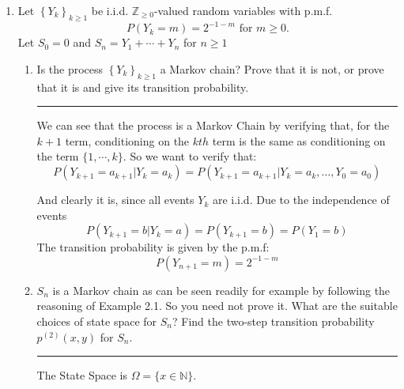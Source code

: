 \documentclass{article} %
\theoremstyle{plain}
\theoremstyle{case}
\begin{document}
\begin{enumerate}[label={\fbox{\textbf{Exercise \#\arabic* :}}}]
  \newpage
  \item Let $\left\{Y_k\right\}_{k \geq 1}$ be i.i.d. $\mathbb{Z}_{\geq 0}$-valued random variables with p.m.f.
    \[
      P\left(Y_k=m\right)=2^{-1-m} \text { for } m \geq 0 .
      \]
    Let $S_0=0$ and $S_n=Y_1+\cdots+Y_n$ for $n \geq 1$
    \begin{enumerate}
      \item Is the process $\left\{Y_k\right\}_{k \geq 1}$ a Markov chain?
        Prove that it is not, or prove that it is and give its transition
        probability.
\par\noindent\rule{\textwidth}{0.1pt}
        We can see that the process is a Markov Chain by verifying that,
        for the $k+1$ term, conditioning on the $k{th}$ term is the same
        as conditioning on the term $\{1, \cdots, k\}$.   So we want to
        verify that:
        \[ P(Y_{k+1}= a_{k+1} | Y_{k} = a_k)=P(Y_{k+1}= a_{k+1} | Y_{k}=a_k, \dots , Y_{0}=a_0) \]

        And clearly it is, since all events $Y_k$ are i.i.d.  Due
        to the independence of events
        \[ P(Y_{k+1}=b | Y_{k} = a)=P(Y_{k+1}=b) = P(Y_1 = b)  \]
        The transition probability is given by the p.m.f:
        \[ P(Y_{n+1}=m) = 2^{-1-m} \]
      \item  $S_n$ is a Markov chain as can be seen readily for example by following the reasoning of Example 2.1. So you need not prove it. What are the suitable choices of state space for $S_n$? Find the two-step transition probability $p^{(2)}(x, y)$ for $S_n$.
\par\noindent\rule{\textwidth}{0.1pt}
        The State Space is $\Omega = \{ x \in \mathbb{N} \}$.


\end{enumerate}
\end{enumerate}
\end{document}
